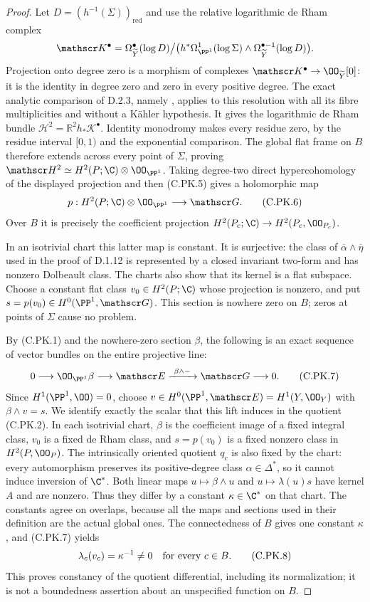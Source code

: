 \begin{proof}
Let $D=(h^{-1}(\Sigma))_{\mathrm{red}}$ and use the
relative logarithmic de Rham complex
\[
 \mathscr K^\bullet=
 \Omega_{\widetilde Y}^\bullet(\log D)\big/
 \bigl(h^*\Omega_{\PP^1}^1(\log\Sigma)
       \wedge\Omega_{\widetilde Y}^{\bullet-1}(\log D)\bigr).
\]
Projection onto degree zero is a morphism of complexes
$\mathscr K^\bullet\to\OO_{\widetilde Y}[0]$:
it is the identity in degree zero and zero in every
positive degree. The exact analytic comparison of D.2.3,
namely \cite[Theorem~2.18 and \S\S2.19--2.21]{Steenbrink1976},
applies to this resolution with all its fibre multiplicities
and without a K\"ahler hypothesis. It gives the logarithmic
de Rham bundle
$\mathscr H^2=\mathbb R^2h_*\mathscr K^\bullet$.
Identity monodromy makes every residue zero, by the
residue interval $[0,1)$ and the exponential comparison.
The global flat frame on $B$ therefore extends across
every point of $\Sigma$, proving
$\mathscr H^2\simeq H^2(P;\C)\otimes\OO_{\PP^1}$.
Taking degree-two direct hypercohomology of the displayed
projection and then (C.PK.5) gives a holomorphic map
\[
 p:H^2(P;\C)\otimes\OO_{\PP^1}
          \longrightarrow\mathscr G.
\tag{C.PK.6}
\]
Over $B$ it is precisely the coefficient projection
$H^2(P_c;\C)\to H^2(P_c,\OO_{P_c})$.

In an isotrivial chart this latter map is constant. It is
surjective: the class of
$\overline\alpha\wedge\overline\eta$ used in the proof
of D.1.12 is represented by a closed invariant two-form
and has nonzero Dolbeault class. The charts also show
that its kernel is a flat subspace. Choose a constant flat
class $v_0\in H^2(P;\C)$ whose projection is nonzero,
and put $s=p(v_0)\in H^0(\PP^1,\mathscr G)$.
This section is nowhere zero on $B$; zeros at points
of $\Sigma$ cause no problem.

By (C.PK.1) and the nowhere-zero section $\beta$, the
following is an exact sequence of vector bundles on the
entire projective line:
\[
 0\longrightarrow\OO_{\PP^1}\beta
  \longrightarrow\mathscr E
  \xrightarrow{\ \beta\wedge-\ }\mathscr G
  \longrightarrow0.
\tag{C.PK.7}
\]
Since $H^1(\PP^1,\OO)=0$, choose
$v\in H^0(\PP^1,\mathscr E)=H^1(Y,\OO_Y)$ with
$\beta\wedge v=s$.
We identify exactly the scalar that this lift induces in
the quotient (C.PK.2). In each isotrivial chart,
$\beta$ is the coefficient image of a fixed integral
class, $v_0$ is a fixed de Rham class, and $s=p(v_0)$
is a fixed nonzero class in $H^2(P,\OO_P)$.
The intrinsically oriented quotient $q_c$ is also fixed
by the chart: every automorphism preserves its
positive-degree class $\alpha\in\Delta^*$, so it cannot
induce inversion of $\C^*$.
Both linear maps $u\mapsto\beta\wedge u$ and
$u\mapsto\lambda(u)s$ have kernel $A$ and are nonzero.
Thus they differ by a constant $\kappa\in\C^*$ on
that chart. The constants agree on overlaps, because
all the maps and sections used in their definition are
the actual global ones. The connectedness of $B$ gives
one constant $\kappa$, and (C.PK.7) yields
\[
 \lambda_c(v_c)=\kappa^{-1}\ne0
 \quad\hbox{for every }c\in B.
\tag{C.PK.8}
\]
This proves constancy of the quotient differential,
including its normalization; it is not a boundedness
assertion about an unspecified function on $B$.


\end{proof}
